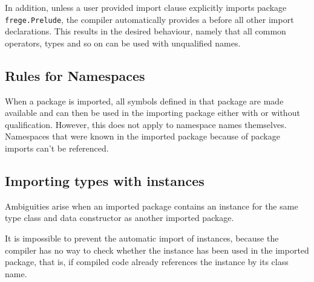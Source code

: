 In addition, unless a user provided import clause explicitly imports package \texttt{frege.Prelude}, the
compiler automatically provides a
before all other import declarations.
This results
in the desired behaviour, namely that all common operators, types and
so on can be used with unqualified names.


\subsection{Rules for Namespaces}

When a package is imported, all symbols defined in that package are made
available and can then be used in the importing package either
with or without qualification.
However, this does not apply to namespace names themselves. 
Namespaces that were known in the imported package
because of package imports can't be referenced.

\subsection{Importing types with instances}

Ambiguities arise when an imported package contains an instance for
the same type class and data constructor as another imported package.

It is impossible to prevent the automatic import of instances,
because the compiler has no way to check whether the instance has been
used in the imported package, that is, if compiled code already
references the instance by its \java{} class name.


